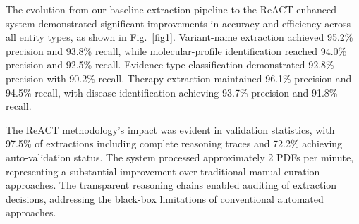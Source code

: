 The evolution from our baseline extraction pipeline to the ReACT-enhanced system demonstrated significant improvements in accuracy and efficiency across all entity types, as shown in Fig.~\ref{fig1}. Variant-name extraction achieved 95.2\% precision and 93.8\% recall, while molecular-profile identification reached 94.0\% precision and 92.5\% recall. Evidence-type classification demonstrated 92.8\% precision with 90.2\% recall. Therapy extraction maintained 96.1\% precision and 94.5\% recall, with disease identification achieving 93.7\% precision and 91.8\% recall.

The ReACT methodology's impact was evident in validation statistics, with 97.5\% of extractions including complete reasoning traces and 72.2\% achieving auto-validation status. The system processed approximately 2 PDFs per minute, representing a substantial improvement over traditional manual curation approaches. The transparent reasoning chains enabled auditing of extraction decisions, addressing the black-box limitations of conventional automated approaches.

%
%
%
%
%

%
%
%
%
%
%

